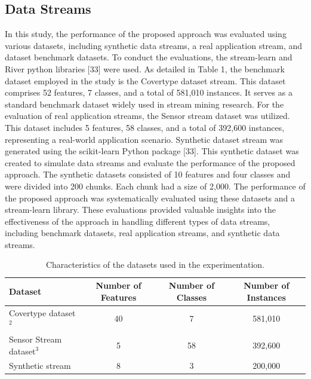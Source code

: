 \subsection{Data Streams}
In this study, the performance of the proposed approach was evaluated using various datasets, including synthetic data streams, a real application stream, and dataset benchmark datasets. To conduct the evaluations, the stream-learn and River python libraries [33] were used. As detailed in Table 1, the benchmark dataset employed in the study is the Covertype dataset stream. This dataset comprises 52 features, 7 classes, and a total of 581,010 instances. It serves as a standard benchmark dataset widely used in stream mining research. For the evaluation of real application streams, the Sensor stream dataset was utilized. This dataset includes 5 features, 58 classes, and a total of 392,600 instances, representing a real-world application scenario. Synthetic dataset stream was generated using the scikit-learn Python package [33]. This synthetic dataset was created to simulate data streams and evaluate the performance of the proposed approach. The synthetic datasets consisted of 10 features and four classes and were divided into 200 chunks. Each chunk had a size of 2,000. The performance of the proposed approach was systematically evaluated using these datasets and a stream-learn library. These evaluations provided valuable insights into the effectiveness of the approach in handling different types of data streams, including benchmark datasets, real application streams, and synthetic data streams.
\begin{table}[h!]
  \centering
  \begin{tabular}{|l|c|c|c|}
  \hline
  \textbf{Dataset} & \textbf{Number of Features} & \textbf{Number of Classes} & \textbf{Number of Instances} \\ \hline
  Covertype dataset$^2$ & 40 & 7 & 581,010 \\ \hline
  Sensor Stream dataset$^3$ & 5 & 58 & 392,600 \\ \hline
  Synthetic stream & 8 & 3 & 200,000 \\ \hline
  \end{tabular}
  \caption{Characteristics of the datasets used in the experimentation.}
  \label{tab:4_first_proposal_result_table_1}
  \end{table}

  \su

